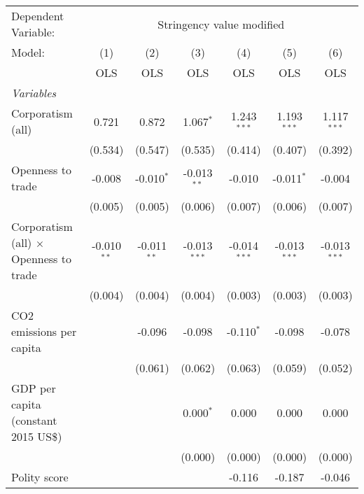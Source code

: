 
\begingroup
\centering
\begin{tabular}{lcccccc}
   \toprule
   Dependent Variable: & \multicolumn{6}{c}{Stringency value modified}\\
   Model:                                        & (1)           & (2)           & (3)            & (4)            & (5)            & (6)\\  
                                                 &  OLS          & OLS           & OLS            & OLS            & OLS            & OLS\\  
   \midrule
   \emph{Variables}\\
   Corporatism (all)                             & 0.721         & 0.872         & 1.067$^{*}$    & 1.243$^{***}$  & 1.193$^{***}$  & 1.117$^{***}$\\   
                                                 & (0.534)       & (0.547)       & (0.535)        & (0.414)        & (0.407)        & (0.392)\\   
   Openness to trade                             & -0.008        & -0.010$^{*}$  & -0.013$^{**}$  & -0.010         & -0.011$^{*}$   & -0.004\\   
                                                 & (0.005)       & (0.005)       & (0.006)        & (0.007)        & (0.006)        & (0.007)\\   
   Corporatism (all) $\times$ Openness to trade  & -0.010$^{**}$ & -0.011$^{**}$ & -0.013$^{***}$ & -0.014$^{***}$ & -0.013$^{***}$ & -0.013$^{***}$\\   
                                                 & (0.004)       & (0.004)       & (0.004)        & (0.003)        & (0.003)        & (0.003)\\   
   CO2 emissions per capita                      &               & -0.096        & -0.098         & -0.110$^{*}$   & -0.098         & -0.078\\   
                                                 &               & (0.061)       & (0.062)        & (0.063)        & (0.059)        & (0.052)\\   
   GDP per capita (constant 2015 US\$)           &               &               & 0.000$^{*}$    & 0.000          & 0.000          & 0.000\\   
                                                 &               &               & (0.000)        & (0.000)        & (0.000)        & (0.000)\\   
   Polity score                                  &               &               &                & -0.116         & -0.187         & -0.046\\   

\end{tabular}
